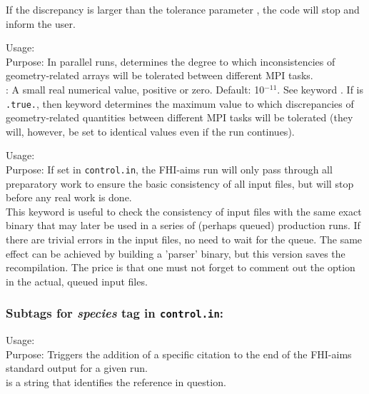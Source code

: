 If the discrepancy is larger than the tolerance parameter
, the code will stop and inform
the user.

{
  \noindent
  Usage:   \\[1.0ex]
  Purpose: In parallel runs, determines the degree to which
    inconsistencies of geometry-related arrays will be tolerated
    between different MPI tasks. \\[1.0ex] 
   : A small real numerical value, positive or zero. Default:
    10$^{-11}$. 
}
%
See keyword . If
 is \texttt{.true.}, then keyword
 determines the maximum value
to which discrepancies of geometry-related quantities between
different MPI tasks will be tolerated (they will, however, be
set to identical values even if the run continues).

{
  \noindent
  Usage:  \\[1.0ex]
  Purpose: If set in \texttt{control.in}, the FHI-aims run will only
  pass through all preparatory work to ensure the basic consistency of
  all input files, but will stop before any real work is done.
 \\[1.0ex]
}
%
This keyword is useful to check the consistency of input files with
the same exact binary that may later be used in a series of (perhaps
queued) production runs. If there are trivial errors in the input
files, no need to wait for the queue. The same effect can be achieved
by building a 'parser' binary, but this version saves the
recompilation. The price is that one must not forget to comment out
the  option in the actual, queued input files.

\subsubsection*{Subtags for \emph{species} tag in \texttt{control.in}:}

{
  \noindent
  Usage:   \\[1.0ex]
  Purpose: Triggers the addition of a specific citation to the end
           of the FHI-aims standard output for a given run. \\[1.0ex] 
   is a string that identifies the reference in question. \\
}

